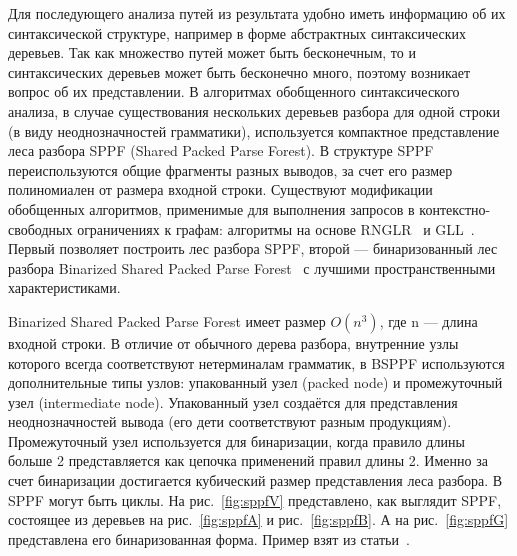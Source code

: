 Для последующего анализа путей из результата удобно иметь информацию об их синтаксической структуре, например в форме абстрактных синтаксических деревьев. Так как множество путей может быть бесконечным, то и синтаксических деревьев может быть бесконечно много, поэтому возникает вопрос об их представлении. В алгоритмах обобщенного синтаксического анализа, в случае существования нескольких деревьев разбора для одной строки (в виду неоднозначностей грамматики), используется компактное представление леса разбора SPPF (Shared Packed Parse Forest). В структуре SPPF переиспользуются общие фрагменты разных выводов, за счет его размер полиномиален от размера входной строки. Существуют модификации обобщенных алгоритмов, применимые для выполнения запросов в контекстно-свободных ограничениях к графам: алгоритмы на основе RNGLR~\cite{RNGLR} и GLL~\cite{GrigRagCFPQuerying}. Первый позволяет построить лес разбора SPPF, второй --- бинаризованный лес разбора Binarized Shared Packed Parse Forest~\cite{SPPF} с лучшими пространственными характеристиками. 

Binarized Shared Packed Parse Forest имеет размер $O(n^3)$, где n --- длина входной строки. В отличие от обычного дерева разбора, внутренние узлы которого всегда соответствуют нетерминалам грамматик, в BSPPF используются дополнительные типы узлов: упакованный узел (packed node) и промежуточный узел (intermediate node). Упакованный узел создаётся для представления неоднозначностей вывода (его дети соответствуют разным продукциям). Промежуточный узел используется для бинаризации, когда правило длины больше 2 представляется как цепочка применений правил длины 2. Именно за счет бинаризации достигается кубический размер представления леса разбора. В SPPF могут быть циклы. На рис.~\ref{fig:sppfV} представлено, как выглядит SPPF, состоящее из деревьев на рис.~\ref{fig:sppfA} и рис.~\ref{fig:sppfB}. А на рис.~\ref{fig:sppfG} представлена его бинаризованная форма. Пример взят из статьи~\cite{IzmCombinator}.

